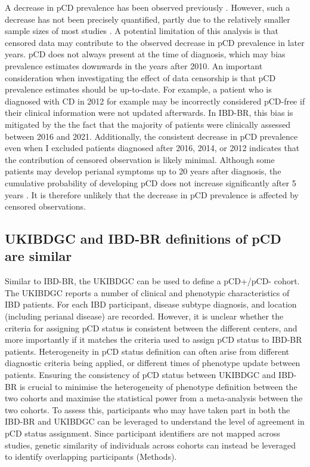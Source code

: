     A decrease in pCD prevalence has been observed previously \cite{Park2019-kj}. However, such a decrease has not been precisely quantified, partly due to the relatively smaller sample sizes of most studies \cite{Brochard2022-kz,Bruckner2018-ag,Gottgens2017-df,Tsai2022-kz}. A potential limitation of this analysis is that censored data may contribute to the observed decrease in pCD prevalence in later years. pCD does not always present at the time of diagnosis, which may bias prevalence estimates downwards in the years after 2010. An important consideration when investigating the effect of data censorship is that pCD prevalence estimates should be up-to-date. For example, a patient who is diagnosed with CD in 2012 for example may be incorrectly considered pCD-free if their clinical information were not updated afterwards. In IBD-BR, this bias is mitigated by the the fact that the majority of patients were clinically assessed between 2016 and 2021. Additionally, the consistent decrease in pCD prevalence even when I excluded patients diagnosed after 2016, 2014, or 2012 indicates that the contribution of censored observation is likely minimal. Although some patients may develop perianal symptoms up to 20 years after diagnosis, the cumulative probability of developing pCD does not increase significantly after 5 years \cite{Tsai2022-kz}. It is therefore unlikely that the decrease in pCD prevalence is affected by censored observations.

    \subsection{UKIBDGC and IBD-BR definitions of pCD are similar}
    Similar to IBD-BR, the UKIBDGC can be used to define a pCD+/pCD- cohort. The UKIBDGC reports a number of clinical and phenotypic characteristics of IBD patients. For each IBD participant, disease subtype diagnosis, and location (including perianal disease) are recorded. However, it is unclear whether the criteria for assigning pCD status is consistent between the different centers, and more importantly if it matches the criteria used to assign pCD status to IBD-BR patients. Heterogeneity in pCD status definition can often arise from different diagnostic criteria being applied, or different times of phenotype update between patients. Ensuring the consistency of pCD status between UKIBDGC and IBD-BR is crucial to minimise the heterogeneity of phenotype definition between the two cohorts and maximise the statistical power from a meta-analysis between the two cohorts. 
To assess this, participants who may have taken part in both the IBD-BR and UKIBDGC can be leveraged to understand the level of agreement in pCD status assignment. Since participant identifiers are not mapped across studies, genetic similarity of individuals across cohorts can instead be leveraged to identify overlapping participants (Methods).\\

